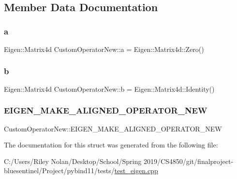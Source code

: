 \subsection{Member Data Documentation}
\mbox{\label{struct_custom_operator_new_ad0f5f8aaedbb84dc5d904389a05f5740}} 
\subsubsection{\texorpdfstring{a}{a}}
{\footnotesize\ttfamily Eigen\+::\+Matrix4d Custom\+Operator\+New\+::a = Eigen\+::\+Matrix4d\+::\+Zero()}

\mbox{\label{struct_custom_operator_new_adae79d9b641ba4b7f4221e6bdd7dcc49}} 
\subsubsection{\texorpdfstring{b}{b}}
{\footnotesize\ttfamily Eigen\+::\+Matrix4d Custom\+Operator\+New\+::b = Eigen\+::\+Matrix4d\+::\+Identity()}

\mbox{\label{struct_custom_operator_new_a5c9fd4a1fa6f897105929bdd74c91368}} 
\subsubsection{\texorpdfstring{EIGEN\_MAKE\_ALIGNED\_OPERATOR\_NEW}{EIGEN\_MAKE\_ALIGNED\_OPERATOR\_NEW}}
{\footnotesize\ttfamily Custom\+Operator\+New\+::\+E\+I\+G\+E\+N\+\_\+\+M\+A\+K\+E\+\_\+\+A\+L\+I\+G\+N\+E\+D\+\_\+\+O\+P\+E\+R\+A\+T\+O\+R\+\_\+\+N\+EW}



The documentation for this struct was generated from the following file\+:\begin{DoxyCompactItemize}
\item 
C\+:/\+Users/\+Riley Nolan/\+Desktop/\+School/\+Spring 2019/\+C\+S4850/git/finalproject-\/bluesentinel/\+Project/pybind11/tests/\mbox{\hyperlink{test__eigen_8cpp}{test\+\_\+eigen.\+cpp}}\end{DoxyCompactItemize}
